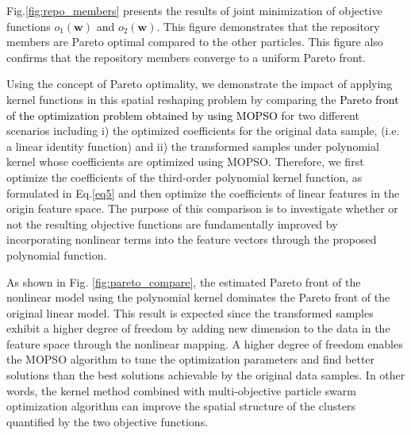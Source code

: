 Fig.\ref{fig:repo_members} presents the results of joint minimization of objective functions $o_1(\mathbf{w})$ and $o_2(\mathbf{w})$. This figure demonstrates that the repository members are Pareto optimal compared to the other particles. This figure also confirms that the repository members converge to a uniform Pareto front. 

Using the concept of Pareto optimality, we demonstrate the impact of applying kernel functions in this spatial reshaping problem by comparing the \textcolor{black}{Pareto front of the optimization problem obtained by using MOPSO} for two different scenarios including i) the optimized coefficients for the original data sample, (i.e. a linear identity function) and ii) the transformed samples under polynomial kernel whose coefficients are optimized using MOPSO. Therefore, we first optimize the coefficients of the third-order polynomial kernel function, as formulated in Eq.\ref{eq5} and then optimize the coefficients of linear features in the origin feature space. The purpose of this comparison is to investigate whether or not the resulting objective functions are fundamentally improved by incorporating nonlinear terms into the feature vectors through the proposed polynomial function.  %


As shown in Fig. \ref{fig:pareto_compare}, the estimated Pareto front of the nonlinear model using the polynomial kernel dominates the Pareto front of the original linear model. This result is expected since the transformed samples exhibit a higher degree of freedom by adding new dimension to the data in the feature space through the nonlinear mapping. 
A higher degree of freedom enables the MOPSO algorithm to tune the optimization parameters and find better solutions than the best solutions achievable by the original data samples. In other words, the kernel method combined with multi-objective particle swarm optimization algorithm can improve the spatial structure of the clusters quantified by the two objective functions.

